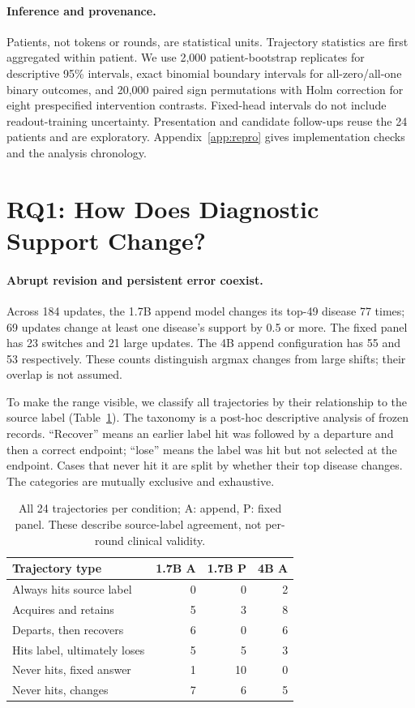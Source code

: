 \documentclass[11pt]{article}
\begin{document}
\paragraph{Inference and provenance.}
Patients, not tokens or rounds, are statistical units. Trajectory statistics are first aggregated within patient. We use 2,000 patient-bootstrap replicates for descriptive 95\% intervals, exact binomial boundary intervals for all-zero/all-one binary outcomes, and 20,000 paired sign permutations with Holm correction for eight prespecified intervention contrasts. Fixed-head intervals do not include readout-training uncertainty. Presentation and candidate follow-ups reuse the 24 patients and are exploratory. Appendix~\ref{app:repro} gives implementation checks and the analysis chronology.

\section{RQ1: How Does Diagnostic Support Change?}
\label{sec:behavior}
\paragraph{Abrupt revision and persistent error coexist.}
Across 184 updates, the 1.7B append model changes its top-49 disease 77 times; 69 updates change at least one disease's support by 0.5 or more. The fixed panel has 23 switches and 21 large updates. The 4B append configuration has 55 and 53 respectively. These counts distinguish argmax changes from large shifts; their overlap is not assumed.

To make the range visible, we classify all trajectories by their relationship to the source label (Table~\ref{tab:patterns}). The taxonomy is a post-hoc descriptive analysis of frozen records. ``Recover'' means an earlier label hit was followed by a departure and then a correct endpoint; ``lose'' means the label was hit but not selected at the endpoint. Cases that never hit it are split by whether their top disease changes. The categories are mutually exclusive and exhaustive.

\begin{table}[t]
\centering\small
\begin{tabular}{lrrr}\toprule
Trajectory type & 1.7B A & 1.7B P & 4B A\\\midrule
Always hits source label & 0 & 0 & 2\\
Acquires and retains & 5 & 3 & 8\\
Departs, then recovers & 6 & 0 & 6\\
Hits label, ultimately loses & 5 & 5 & 3\\
Never hits, fixed answer & 1 & 10 & 0\\
Never hits, changes & 7 & 6 & 5\\\bottomrule
\end{tabular}
\caption{All 24 trajectories per condition; A: append, P: fixed panel. These describe source-label agreement, not per-round clinical validity.}\label{tab:patterns}
\end{table}
\end{document}
